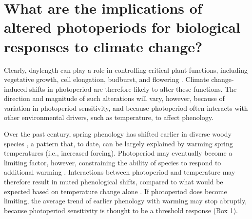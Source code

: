 \documentclass{article}
\begin{document}
\section*{What are the implications of altered photoperiods for biological responses to climate change?}
\par Clearly, daylength can play a role in controlling critical plant functions, including vegetative growth, cell elongation, budburst, and flowering \citep{Linkosalo:2006aa,erwin1998,sidaway2010, Hsu:2011,Heide:2011aa,Ashby:1962aa,Heide:2012aa,mimura2007}. Climate change-induced shifts in photoperiod are therefore likely to alter these functions. The direction and magnitude of such alterations will vary, however, because of variation in photoperiod sensitivity, and because photoperiod often interacts with other environmental drivers, such as temperature, to affect phenology. 

\par Over the past century, spring phenology has shifted earlier in diverse woody species \citep{menzel2000}, a pattern that, to date, can be largely explained by warming spring temperatures (i.e., increased forcing). Photoperiod may eventually become a limiting factor, however, constraining the ability of species to respond to additional warming \citep{koerner2010b,vitasse2013, Morin:2010aa,Nienstaedt:1966aa}. Interactions between photoperiod and temperature may therefore result in muted phenological shifts, compared to what would be expected based on temperature change alone \citep{wareing1956,mimura2007,koerner2010b}. If photoperiod does become limiting, the average trend of earlier phenology with warming may stop abruptly, because photoperiod sensitivity is thought to be a threshold response (Box 1). 

\end{document}
